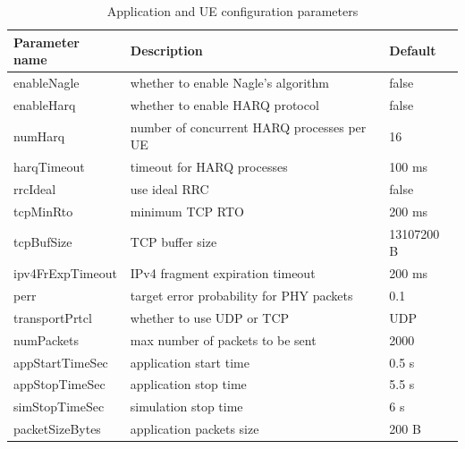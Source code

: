 \begin{table}[ht]
    \begin{small}
    \begin{tabular}{l|ll}
    \textbf{Parameter name} & \textbf{Description}                       & \textbf{Default} \\ \hline
    enableNagle             & whether to enable Nagle's algorithm        & false            \\
    enableHarq              & whether to enable HARQ protocol            & false            \\
    numHarq                 & number of concurrent HARQ processes per UE & 16               \\
    harqTimeout             & timeout for HARQ processes                 & 100 ms           \\
    rrcIdeal                & use ideal RRC                              & false            \\
    tcpMinRto               & minimum TCP RTO                            & 200 ms           \\
    tcpBufSize              & TCP buffer size                            & 13107200 B       \\
    ipv4FrExpTimeout        & IPv4 fragment expiration timeout           & 200 ms           \\
    perr                    & target error probability for PHY packets   & 0.1              \\
    transportPrtcl          & whether to use UDP or TCP                  & UDP              \\
    numPackets              & max number of packets to be sent           & 2000             \\
    appStartTimeSec         & application start time                     & 0.5 s            \\
    appStopTimeSec          & application stop time                      & 5.5 s            \\
    simStopTimeSec          & simulation stop time                       & 6 s              \\
    packetSizeBytes         & application packets size                   & 200 B           
    \end{tabular}
    \end{small}
    \caption{Application and UE configuration parameters}
    \label{tab:params}
\end{table}




